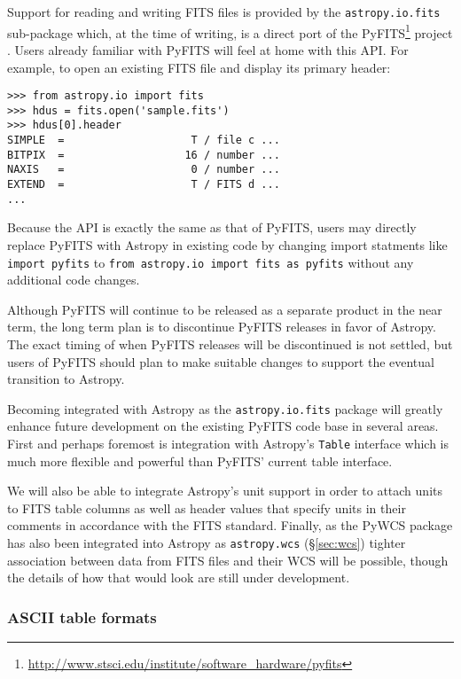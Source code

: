 \documentclass[traditabstract]{aa}
\begin{document}

\label{sec:fits}

Support for reading and writing FITS files is provided by the
\texttt{astropy.io.fits} sub-package which, at the time of writing, is a
direct port of the PyFITS\footnote{\url{http://www.stsci.edu/institute/software_hardware/pyfits}} project \citep{barrett1999pyfits}.
Users already familiar with PyFITS will feel at home with this API.  For example, to open an existing FITS file and display its primary header:

\begin{verbatim}
>>> from astropy.io import fits
>>> hdus = fits.open('sample.fits')
>>> hdus[0].header
SIMPLE  =                    T / file c ...
BITPIX  =                   16 / number ...
NAXIS   =                    0 / number ...
EXTEND  =                    T / FITS d ...
...
\end{verbatim}

Because the API is exactly the same as that of PyFITS, users may directly
replace PyFITS with Astropy in existing code by changing import statments
like \texttt{import pyfits} to \texttt{from astropy.io import fits as pyfits}
without any additional code changes.

Although PyFITS will continue to be released as a separate product in the near
term, the long term plan is to discontinue PyFITS releases in favor of Astropy.
The exact timing of when PyFITS releases will be discontinued is not settled,
but users of PyFITS should plan to make suitable changes to support the eventual
transition to Astropy.

Becoming integrated with Astropy as the \texttt{astropy.io.fits} package will
greatly enhance future development on the existing PyFITS code base in several
areas.  First and perhaps foremost is integration with Astropy's \texttt{Table}
interface which is much more flexible and powerful than PyFITS' current
table interface.

We will also be able to integrate Astropy's unit support in order to attach
units to FITS table columns as well as header values that specify units in
their comments in accordance with the FITS standard.  Finally, as the PyWCS
package has also been integrated into Astropy as \texttt{astropy.wcs}
(\S\ref{sec:wcs}) tighter association between data from FITS files and their WCS
will be possible, though the details of how that would look are still under
development.


\subsubsection{ASCII table formats}
\label{sec:ascii}
\end{document}
